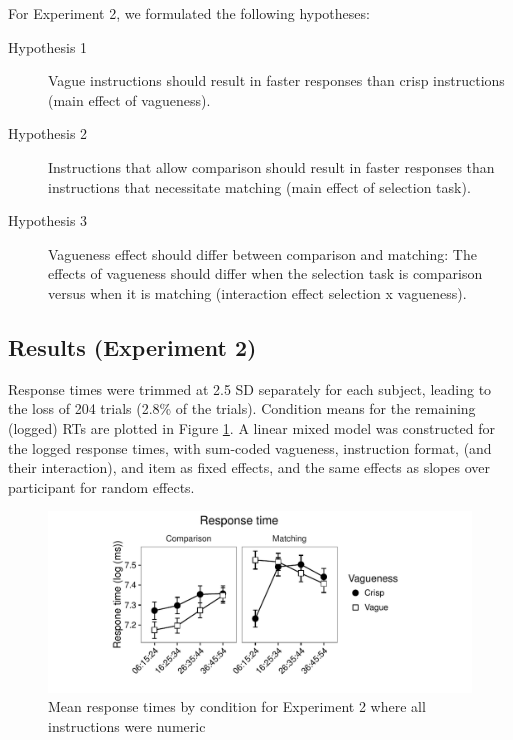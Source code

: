 For Experiment 2, we formulated the following hypotheses:

\begin{description}
\item [Hypothesis 1] Vague instructions should result in faster responses than crisp instructions (main effect of vagueness).
\item [Hypothesis 2] Instructions that allow comparison should result in faster responses than instructions that necessitate matching (main effect of selection task).
\item [Hypothesis 3] Vagueness effect should differ between comparison and matching: The effects of vagueness should differ when the selection task is comparison versus when it is matching (interaction effect selection x vagueness).
\end{description}

\subsection{Results (Experiment 2)}


Response times were trimmed at 2.5 SD separately for each subject, leading to the loss of 204 trials (2.8\% of the trials). Condition means for the remaining (logged) RTs are plotted in Figure \ref{resultsD-exp-2}. A linear mixed model was constructed for the logged response times, with sum-coded vagueness, instruction format, (and their interaction), and item as fixed effects, and the same effects as slopes over participant for random effects.

\begin{figure}[htbp]
\centering
\includegraphics[width=\textwidth]{figures/De2-rtplot-1.pdf}
\caption{Mean response times by condition for Experiment 2 where all instructions were numeric}
\label{resultsD-exp-2}
\end{figure}

